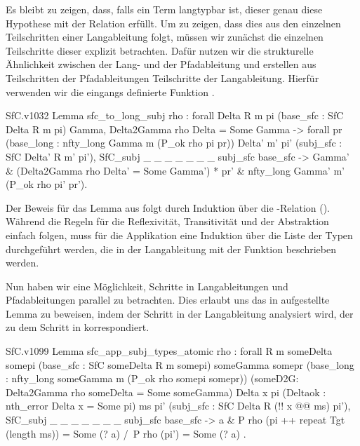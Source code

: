 Es bleibt zu zeigen, dass, falls ein Term langtypbar ist, dieser genau diese Hypothese mit der Relation  erfüllt. Um zu zeigen, dass dies aus den einzelnen Teilschritten einer Langableitung folgt, müssen wir zunächst die einzelnen Teilschritte dieser explizit betrachten. Dafür nutzen wir die strukturelle Ähnlichkeit zwischen der Lang- und der Pfadableitung und erstellen aus Teilschritten der Pfadableitungen Teilschritte der Langableitung. Hierfür verwenden wir die eingangs definierte Funktion .

\begin{code}{SfC.v}{}{1032}
Lemma sfc_to_long_subj {rho} : 
    forall Delta R m pi (base_sfc : SfC Delta R m pi) Gamma,
      Delta2Gamma rho Delta = Some Gamma ->
        forall pr (base_long : nfty_long Gamma m (P_ok rho pi pr))
            Delta' m' pi' (subj_sfc : SfC Delta' R m' pi'),
          SfC_subj _ _ _ _ _ _ _ subj_sfc base_sfc ->
            { Gamma' & (Delta2Gamma rho Delta' = Some Gamma') *
              { pr' & nfty_long Gamma' m' (P_ok rho pi' pr')}}.
\end{code}

Der Beweis für das Lemma aus  folgt durch Induktion über die -Relation (). Während die Regeln für die Reflexivität, Transitivität und der Abstraktion einfach folgen, muss für die Applikation eine Induktion über die Liste der Typen durchgeführt werden, die in der Langableitung mit der Funktion  beschrieben werden.

Nun haben wir eine Möglichkeit, Schritte in Langableitungen und Pfadableitungen parallel zu betrachten. Dies erlaubt uns das in  aufgestellte Lemma zu beweisen, indem der Schritt in der Langableitung  analysiert wird, der zu dem Schritt  in  korrespondiert.

\begin{code}{SfC.v}{}{1099}
Lemma sfc_app_subj_types_atomic {rho} : 
  forall R m someDelta somepi 
    (base_sfc : SfC someDelta R m somepi)
    someGamma somepr 
    (base_long : nfty_long someGamma m (P_ok rho somepi somepr))
    (someD2G: Delta2Gamma rho someDelta = Some someGamma)
    Delta x pi (Deltaok : nth_error Delta x = Some pi)
    ms pi' (subj_sfc : SfC Delta R (!! x @@ ms) pi'),
      SfC_subj _ _ _ _ _ _ _ subj_sfc base_sfc ->
        { a & P rho (pi ++ repeat Tgt (length ms)) = Some (? a) /\ 
            P rho (pi') = Some (? a) }.
\end{code}

